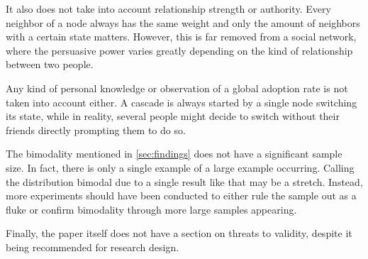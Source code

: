 \documentclass{sig-alternate-05-2015}
\begin{document}
It also does not take into account relationship strength or authority. Every neighbor of a node always has the same weight and only the amount of neighbors with a certain state matters. However, this is far removed from a social network, where the persuasive power varies greatly depending on the kind of relationship between two people.

Any kind of personal knowledge or observation of a global adoption rate is not taken into account either. A cascade is always started by a single node switching its state, while in reality, several people might decide to switch without their friends directly prompting them to do so.

The bimodality mentioned in \ref{sec:findings} does not have a significant sample size. In fact, there is only a single example of a large example occurring. Calling the distribution bimodal due to a single result like that may be a stretch. Instead, more experiments should have been conducted to either rule the sample out as a fluke or confirm bimodality through more large samples appearing.

Finally, the paper itself does not have a section on threats to validity, despite it being recommended for research design\cite{yodawg}.




\end{document}
